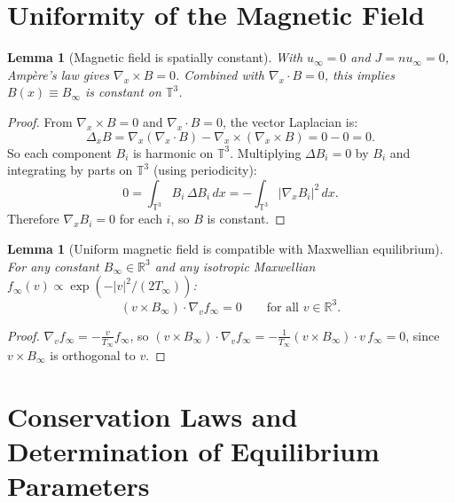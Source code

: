 \documentclass[11pt]{article}
\newcommand{\R}{\mathbb{R}}
\newcommand{\T}{\mathbb{T}}
\newtheorem{lemma}[theorem]{Lemma}
\begin{document}
\section{Uniformity of the Magnetic Field}
\label{sec:magnetic}

\begin{lemma}[Magnetic field is spatially constant]
\label{lem:B_constant}
With $u_\infty = 0$ and $J = n u_\infty = 0$, Amp\`ere's law gives $\nabla_x \times B = 0$. Combined with $\nabla_x \cdot B = 0$, this implies $B(x) \equiv B_\infty$ is constant on $\T^3$.
\end{lemma}

\begin{proof}
From $\nabla_x \times B = 0$ and $\nabla_x \cdot B = 0$, the vector Laplacian is:
\[
\Delta_x B = \nabla_x(\nabla_x \cdot B) - \nabla_x \times (\nabla_x \times B) = 0 - 0 = 0.
\]
So each component $B_i$ is harmonic on $\T^3$. Multiplying $\Delta B_i = 0$ by $B_i$ and integrating by parts on $\T^3$ (using periodicity):
\[
0 = \int_{\T^3} B_i \, \Delta B_i \, dx = -\int_{\T^3} |\nabla_x B_i|^2 \, dx.
\]
Therefore $\nabla_x B_i = 0$ for each $i$, so $B$ is constant.
\end{proof}

\begin{lemma}[Uniform magnetic field is compatible with Maxwellian equilibrium]
\label{lem:B_compatible}
For any constant $B_\infty \in \R^3$ and any isotropic Maxwellian $f_\infty(v) \propto \exp(-|v|^2/(2T_\infty))$:
\[
(v \times B_\infty) \cdot \nabla_v f_\infty = 0 \qquad \text{for all } v \in \R^3.
\]
\end{lemma}

\begin{proof}
$\nabla_v f_\infty = -\frac{v}{T_\infty} f_\infty$, so $(v \times B_\infty) \cdot \nabla_v f_\infty = -\frac{1}{T_\infty} (v \times B_\infty) \cdot v \, f_\infty = 0$, since $v \times B_\infty$ is orthogonal to $v$.
\end{proof}

\section{Conservation Laws and Determination of Equilibrium Parameters}
\label{sec:conservation}
\end{document}
